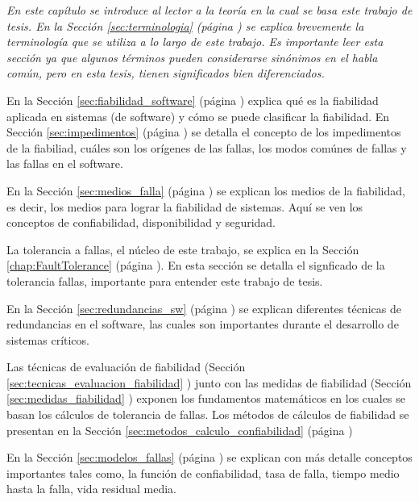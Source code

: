 \vspace{1cm}

\itshape
En este capítulo se introduce al lector a la teoría en la cual se basa este trabajo de tesis. En la
Sección \ref{sec:terminologia} (página \pageref{sec:terminologia}) se explica brevemente la
terminología que se utiliza a lo largo de este trabajo. Es importante leer esta sección ya que
algunos términos pueden considerarse sinónimos en el habla común, pero en esta tesis, tienen
significados bien diferenciados.

En la Sección \ref{sec:fiabilidad_software} (página \pageref{sec:fiabilidad_software}) explica
qué es la fiabilidad aplicada en sistemas (de software) y cómo se puede clasificar la fiabilidad. En
Sección \ref{sec:impedimentos} (página \pageref{sec:impedimentos}) se detalla el concepto de los
impedimentos de la fiabiliad, cuáles son los orígenes de las fallas, los modos comúnes de fallas
y las fallas en el software.

En la Sección \ref{sec:medios_falla} (página \pageref{sec:medios_falla}) se explican los medios de
la fiabilidad, es decir, los medios para lograr la fiabilidad de sistemas. Aquí se ven los conceptos
de confiabilidad, disponibilidad y seguridad.

La tolerancia a fallas, el núcleo de este trabajo, se explica en la Sección \ref{chap:FaultTolerance}
(página \pageref{chap:FaultTolerance}). En esta sección se detalla el signficado de la tolerancia
fallas, importante para entender este trabajo de tesis.

En la Sección \ref{sec:redundancias_sw} (página \pageref{sec:redundancias_sw}) se explican diferentes
técnicas de redundancias en el software, las cuales son importantes durante el desarrollo
de sistemas críticos.

Las técnicas de evaluación de fiabilidad (Sección \ref{sec:tecnicas_evaluacion_fiabilidad}
\pageref{sec:tecnicas_evaluacion_fiabilidad}) junto con las medidas de fiabilidad
(Sección \ref{sec:medidas_fiabilidad} \pageref{sec:medidas_fiabilidad}) exponen los fundamentos
matemáticos en los cuales se basan los cálculos de tolerancia de fallas. Los métodos de cálculos
de fiabilidad se presentan en la Sección \ref{sec:metodos_calculo_confiabilidad} (página
\pageref{sec:metodos_calculo_confiabilidad})

En la Sección \ref{sec:modelos_fallas} (página \pageref{sec:modelos_fallas}) se explican con más
detalle conceptos importantes tales como, la función de confiabilidad, tasa de falla, tiempo medio
hasta la falla, vida residual media.

